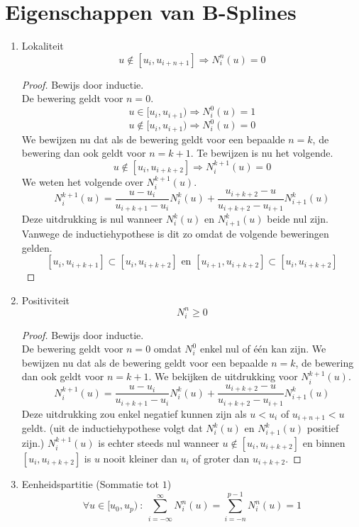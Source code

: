 \documentclass[computergesteund_ontwerp_van_curven_en_oppervlakken.tex]{subfiles}
\begin{document}
\section{Eigenschappen van B-Splines}
\begin{enumerate}
\item Lokaliteit
\[
u \not\in [u_i,u_{i+n+1}] \Rightarrow N_{i}^{n}(u) = 0
\]

\begin{proof} Bewijs door inductie.\\
De bewering geldt voor $n=0$.
\[
u \in [u_i,u_{i+1}) \Rightarrow N_{i}^{0}(u) = 1
\]
\[
u \not\in [u_i,u_{i+1}) \Rightarrow N_{i}^{0}(u) = 0
\]
We bewijzen nu dat als de bewering geldt voor een bepaalde $n=k$, de bewering dan ook geldt voor $n=k+1$.
Te bewijzen is nu het volgende.
\[
u \not\in [u_i,u_{i+k+2}] \Rightarrow N_{i}^{k+1}(u) = 0
\]
We weten het volgende over $N_{i}^{k+1}(u)$.
\[
N_{i}^{k+1}(u)
= \frac{u-u_i}{u_{i+k+1}-u_i}					N_{i}^{k}(u)
+ \frac{u_{i+k+2}-u}{u_{i+k+2}-u_{i+1}}			N_{i+1}^{k}(u)
\]
Deze uitdrukking is nul wanneer $N_{i}^{k}(u)$ en $N_{i+1}^{k}(u)$ beide nul zijn.
Vanwege de inductiehypothese is dit zo omdat de volgende beweringen gelden.
\[
[u_i,u_{i+k+1}] \subset [u_i,u_{i+k+2}]
\text{ en }
[u_{i+1},u_{i+k+2}] \subset [u_i,u_{i+k+2}]
\]
\end{proof}

\item Positiviteit
\[
N_{i}^{n} \ge 0
\]
\begin{proof} Bewijs door inductie.\\
De bewering geldt voor $n=0$ omdat $N_{i}^{0}$ enkel nul of \'e\'en kan zijn.
We bewijzen nu dat als de bewering geldt voor een bepaalde $n=k$, de bewering dan ook geldt voor $n=k+1$.
We bekijken de uitdrukking voor $N_{i}^{k+1}(u)$.
\[
N_{i}^{k+1}(u)
= \frac{u-u_i}{u_{i+k+1}-u_i}					N_{i}^{k}(u)
+ \frac{u_{i+k+2}-u}{u_{i+k+2}-u_{i+1}}			N_{i+1}^{k}(u)
\]
Deze uitdrukking zou enkel negatief kunnen zijn als $u < u_i$ of $u_{i+n+1} < u$ geldt. (uit de inductiehypothese volgt dat $N_{i}^{k}(u)$ en $N_{i+1}^{k}(u)$ positief zijn.)
$N_{i}^{k+1}(u)$ is echter steeds nul wanneer $u \not\in [u_i,u_{i+k+2}]$ en binnen $[u_i,u_{i+k+2}]$ is $u$ nooit kleiner dan $u_i$ of groter dan $u_{i+k+2}$.
\end{proof}

\item Eenheidspartitie (Sommatie tot $1$)
\[
\forall u \in [u_0,u_p)\ :\
\sum_{i=-\infty}^{\infty}N_{i}^{n}(u)
= \sum_{i=-n}^{p-1}N_{i}^{n}(u)
= 1
\]


\end{enumerate}
\end{document}

